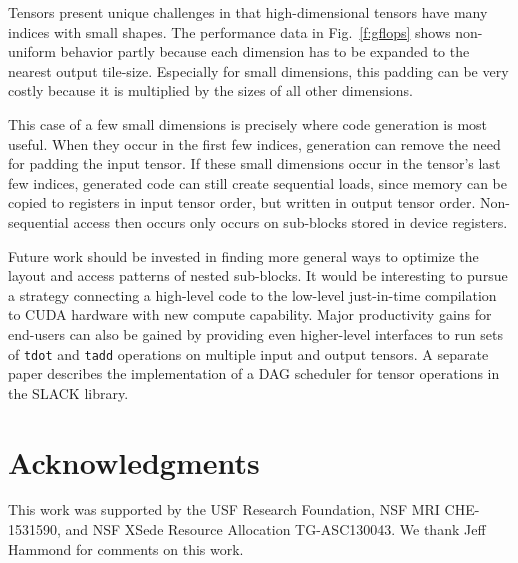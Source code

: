 \documentclass[preprint]{sigplanconf}
\begin{document}
  Tensors present unique challenges in that high-dimensional tensors
have many indices with small shapes.  The performance data in Fig.~\ref{f:gflops}
shows non-uniform behavior partly because each dimension has to be expanded
to the nearest output tile-size.  Especially for small dimensions,
this padding can be very costly because it is multiplied by the
sizes of all other dimensions.

  This case of a few small dimensions is precisely where code generation
is most useful.  When they occur in the first few indices, generation can remove
the need for padding the input tensor.  If these small dimensions occur in the tensor's
last few indices, generated code can still create sequential loads, since memory
can be copied to registers in input tensor order, but written in output tensor order.
Non-sequential access then occurs only occurs on sub-blocks stored in device registers.

  Future work should be invested in finding more general ways to optimize the layout and access patterns
of nested sub-blocks.  It would be interesting to pursue a strategy connecting
a high-level code to the low-level just-in-time compilation to CUDA hardware with
new compute capability.  Major productivity gains for end-users can also be gained by providing
even higher-level interfaces to run sets of {\tt tdot} and {\tt tadd} operations on multiple input and
output tensors.  A separate paper describes the implementation of a DAG scheduler
for tensor operations in the SLACK library.

\section*{Acknowledgments}
  This work was supported by the USF Research Foundation,
NSF MRI CHE-1531590, and NSF XSede Resource Allocation TG-ASC130043.
We thank Jeff Hammond for comments on this work.



\end{document}

